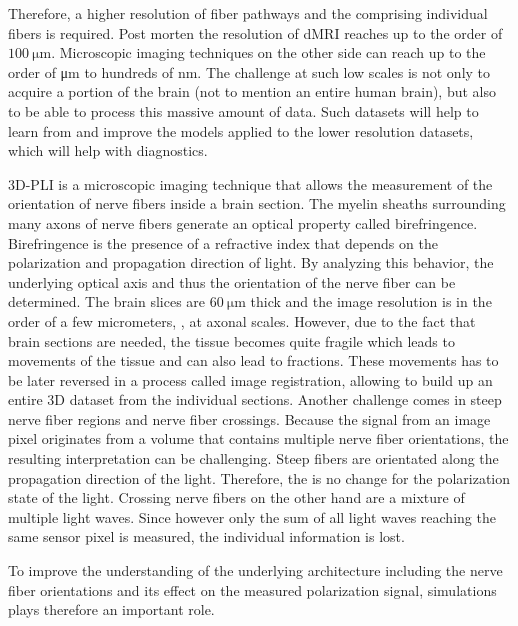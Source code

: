 Therefore, a higher resolution of fiber pathways and the comprising individual fibers is required.
Post morten the resolution of \ac{dMRI} reaches up to the order of $\SI{100}{\micro\meter}$.
Microscopic imaging techniques on the other side can reach up to the order of \si{\micro\meter} to hundreds of \si{\nano\meter}.
The challenge at such low scales is not only to acquire a portion of the brain (not to mention an entire human brain), but also to be able to process this massive amount of data.
Such datasets will help to learn from and improve the models applied to the lower resolution datasets, which will help with \eg{} diagnostics. \\
\cite{MaierHein2017, Schilling2021, Yendiki2021, Costantini2021}
\par
% 
\ac{3D-PLI} is a microscopic imaging technique that allows the measurement of the orientation of nerve fibers inside a brain section.
The myelin sheaths surrounding many axons of nerve fibers generate an optical property called birefringence.
Birefringence is the presence of a refractive index that depends on the polarization and propagation direction of light.
By analyzing this behavior, the underlying optical axis and thus the orientation of the nerve fiber can be determined.
The brain slices are $\SI{60}{\micro\meter}$ thick and the image resolution is in the order of a few micrometers, \ie{}, at axonal scales.
However, due to the fact that brain sections are needed, the tissue becomes quite fragile which leads to movements of the tissue and can also lead to fractions.
These movements has to be later reversed in a process called image registration, allowing to build up an entire 3D dataset from the individual sections.
Another challenge comes in steep nerve fiber regions and nerve fiber crossings.
Because the signal from an image pixel originates from a volume that contains multiple nerve fiber orientations, the resulting interpretation can be challenging.
Steep fibers are \eg{} orientated along the propagation direction of the light.
Therefore, the is no change for the polarization state of the light.
Crossing nerve fibers on the other hand are a mixture of multiple light waves.
Since however only the sum of all light waves reaching the same sensor pixel is measured, the individual information is lost. \\ 
\cite{Axer2011a, Axer2011, Axer2016}
\par
% 
To improve the understanding of the underlying architecture including the nerve fiber orientations and its effect on the measured polarization signal, simulations plays therefore an important role.
